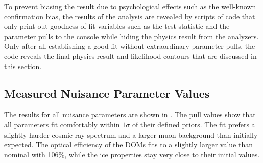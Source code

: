 To prevent biasing the result due to psychological effects such as the well-known confirmation bias, the results of the analysis are revealed by scripts of code that only print out goodness-of-fit variables such as the test statistic and the parameter pulls to the console while hiding the physics result from the analyzers. Only after all establishing a good fit without extraordinary parameter pulls, the code reveals the final physics result and likelihood contours that are discussed in this section.

\subsection{Measured Nuisance Parameter Values}
The results for all nuisance parameters are shown in . The pull values show that all parameters fit comfortably within $1\sigma$ of their defined priors. The fit prefers a slightly harder cosmic ray spectrum and a larger muon background than initially expected. The optical efficiency of the DOMs fits to a slightly larger value than nominal with 106\%, while the ice properties stay very close to their initial values.


